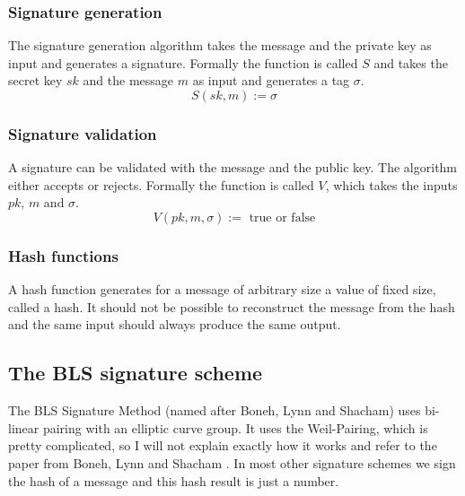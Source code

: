 \documentclass[a4paper,12pt]{scrartcl}
\begin{document}
\subsubsection{Signature generation}

The signature generation algorithm takes the message and the private key as input and generates a signature. Formally the function is called $S$ and takes the secret key $sk$ and the message $m$ as input and generates a tag $\sigma$.
\[
S(sk, m) := \sigma
\]

\subsubsection{Signature validation}

A signature can be validated with the message and the public key. The algorithm either accepts or rejects. Formally the function is called $V$, which takes the inputs $pk$, $m$ and $\sigma$.
\[
V(pk, m, \sigma) := \text{ true or false}
\]

\subsubsection{Hash functions}

A hash function generates for a message of arbitrary size a value of fixed size, called a hash. It should not be possible to reconstruct the message from the hash and the same input should always produce the same output.

\subsection{The BLS signature scheme}
The BLS Signature Method (named after Boneh, Lynn and Shacham) uses bi-linear pairing with an elliptic curve group. It uses the Weil-Pairing, which is pretty complicated, so I will not explain exactly how it works and refer to the paper from Boneh, Lynn and Shacham \cite[]{bls-paper}. In most other signature schemes we sign the hash of a message and this hash result is just a number. 
\end{document}
